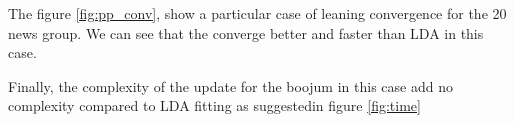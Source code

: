 The figure \ref{fig:pp_conv}, show a particular case of leaning convergence for the 20 news group. We can see that the converge better and faster than LDA in this case. 
\figure{}
\label{fig:pp_conv}

Finally, the complexity of the update for the boojum in this case add no complexity compared to LDA fitting as suggestedin figure \ref{fig:time}

\figure{}
\label{fig:time}

\figure{}
\label{fig:pp_K}









